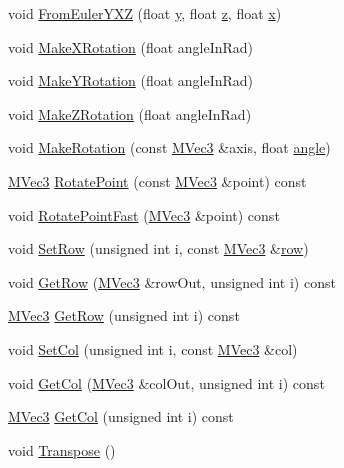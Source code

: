 \begin{CompactItemize}
\item 
void \hyperlink{class_m_mat3x3_b28ee4ae5b4e8278bdad52dfc62d70d7}{FromEulerYXZ} (float \hyperlink{wglext_8h_9298c7ad619074f5285b32c6b72bfdea}{y}, float \hyperlink{glext__bak_8h_5b27107fca91cf19a778530405575b37}{z}, float \hyperlink{wglext_8h_d77deca22f617d3f0e0eb786445689fc}{x})
\item 
void \hyperlink{class_m_mat3x3_bd1bb896aeeaf05ec76624c5e996818b}{MakeXRotation} (float angleInRad)
\item 
void \hyperlink{class_m_mat3x3_772a24dfb662f3348eaf19c5e57b578b}{MakeYRotation} (float angleInRad)
\item 
void \hyperlink{class_m_mat3x3_34c3fe8d743433b98bd1cdf0eb053224}{MakeZRotation} (float angleInRad)
\item 
void \hyperlink{class_m_mat3x3_1513b85723e4ab41feb71d56db6aa625}{MakeRotation} (const \hyperlink{class_m_vec3}{MVec3} \&axis, float \hyperlink{glext_8h_9e06c1f76a20fed54ca742cd25cb02c4}{angle})
\item 
\hyperlink{class_m_vec3}{MVec3} \hyperlink{class_m_mat3x3_84fad6815686a050837119f242650324}{RotatePoint} (const \hyperlink{class_m_vec3}{MVec3} \&point) const 
\item 
void \hyperlink{class_m_mat3x3_15242b646b6462a0f6fa44b324ff009c}{RotatePointFast} (\hyperlink{class_m_vec3}{MVec3} \&point) const 
\item 
void \hyperlink{class_m_mat3x3_1cd3b344fa0732e7be859ce95f35f063}{SetRow} (unsigned int i, const \hyperlink{class_m_vec3}{MVec3} \&\hyperlink{glext__bak_8h_08e0b6bb56b39ff71be380b4cdf5ec33}{row})
\item 
void \hyperlink{class_m_mat3x3_a4ca3211b668abaa0ce6cefb4792dd1f}{GetRow} (\hyperlink{class_m_vec3}{MVec3} \&rowOut, unsigned int i) const 
\item 
\hyperlink{class_m_vec3}{MVec3} \hyperlink{class_m_mat3x3_31977832772ce75b2ad0d494e6bbcd30}{GetRow} (unsigned int i) const 
\item 
void \hyperlink{class_m_mat3x3_7f30bf03e58ead2cd8d781234be60868}{SetCol} (unsigned int i, const \hyperlink{class_m_vec3}{MVec3} \&col)
\item 
void \hyperlink{class_m_mat3x3_287d293d9d309a9991ffb4cae6652998}{GetCol} (\hyperlink{class_m_vec3}{MVec3} \&colOut, unsigned int i) const 
\item 
\hyperlink{class_m_vec3}{MVec3} \hyperlink{class_m_mat3x3_fec431f74f2796faa5abfdffd767f841}{GetCol} (unsigned int i) const 
\item 
void \hyperlink{class_m_mat3x3_d7c9471fbcf788b8140a336ad7139a21}{Transpose} ()

\end{CompactItemize}
